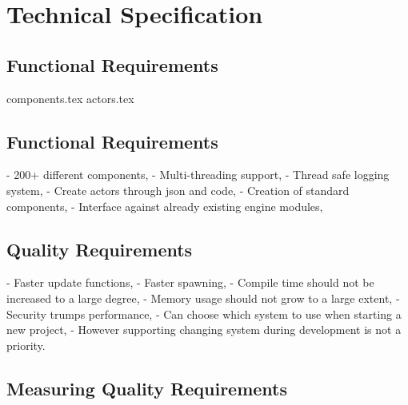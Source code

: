 \documentclass{article}
\begin{document}

\section*{Technical Specification}
\subsection*{Functional Requirements}
{components.tex}
{actors.tex}

\subsection*{Functional Requirements}
- 200+ different components,
- Multi-threading support,
- Thread safe logging system,
- Create actors through json and code,
- Creation of standard components,
- Interface against already existing engine modules,

\subsection*{Quality Requirements}
- Faster update functions,
- Faster spawning,
- Compile time should not be increased to a large degree,
- Memory usage should not grow to a large extent,
- Security trumps performance, 
- Can choose which system to use when starting a new project,
    - However supporting changing system during development is not a priority.

\subsection*{Measuring Quality Requirements}
\end{document}
